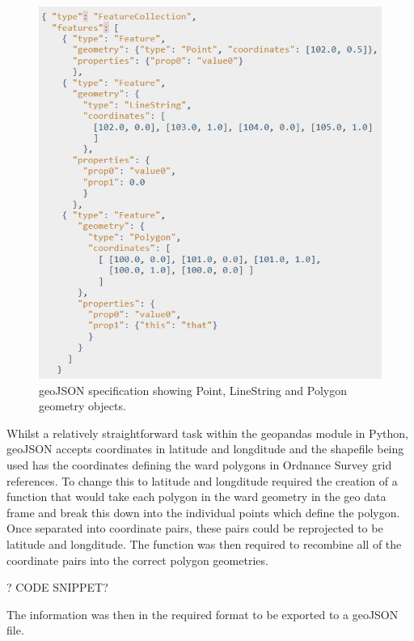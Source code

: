 \begin{figure}
\centering
\includegraphics[scale=0.7]{figures/geoJSON}
\decoRule
\caption{geoJSON specification showing Point, LineString and Polygon geometry objects.}
\end{figure}

Whilst a relatively straightforward task within the geopandas module in Python, geoJSON accepts coordinates in latitude and longditude and the shapefile being used has the coordinates defining the ward polygons in Ordnance Survey grid references. To change this to latitude and longditude required the creation of a function that would take each polygon in the ward geometry in the geo data frame and break this down into the individual points which define the polygon. Once separated into coordinate pairs, these pairs could be reprojected to be latitude and longditude. The function was then required to recombine all of the coordinate pairs into the correct polygon geometries.

? CODE SNIPPET?

The information was then in the required format to be exported to a geoJSON file.


